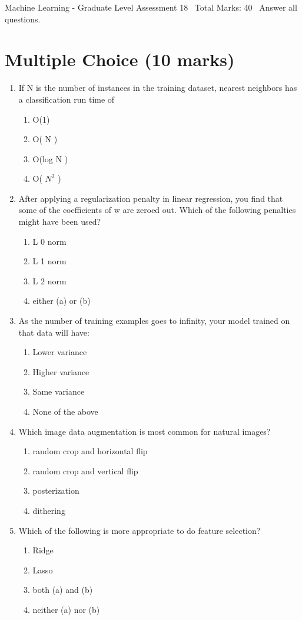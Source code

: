 \documentclass[12pt]{article}
\begin{document}
\begin{center}
Machine Learning - Graduate Level Assessment 18 \
Total Marks: 40 \
Answer all questions.
\end{center}

\section*{Multiple Choice (10 marks)}
\begin{enumerate}[label=\arabic*.]
\item If N is the number of instances in the training dataset, nearest neighbors has a classification run time of
\begin{enumerate}[label=(\alph*)]
    \item O(1)
    \item O( N )
    \item O(log N )
    \item O( $N^2$ )
\end{enumerate}
\item After applying a regularization penalty in linear regression, you find that some of the coefficients of w are zeroed out. Which of the following penalties might have been used?
\begin{enumerate}[label=(\alph*)]
    \item L 0 norm
    \item L 1 norm
    \item L 2 norm
    \item either (a) or (b)
\end{enumerate}
\item As the number of training examples goes to infinity, your model trained on that data will have:
\begin{enumerate}[label=(\alph*)]
    \item Lower variance
    \item Higher variance
    \item Same variance
    \item None of the above
\end{enumerate}
\item Which image data augmentation is most common for natural images?
\begin{enumerate}[label=(\alph*)]
    \item random crop and horizontal flip
    \item random crop and vertical flip
    \item posterization
    \item dithering
\end{enumerate}
\item Which of the following is more appropriate to do feature selection?
\begin{enumerate}[label=(\alph*)]
    \item Ridge
    \item Lasso
    \item both (a) and (b)
    \item neither (a) nor (b)
\end{enumerate}
\end{enumerate}
\end{document}
